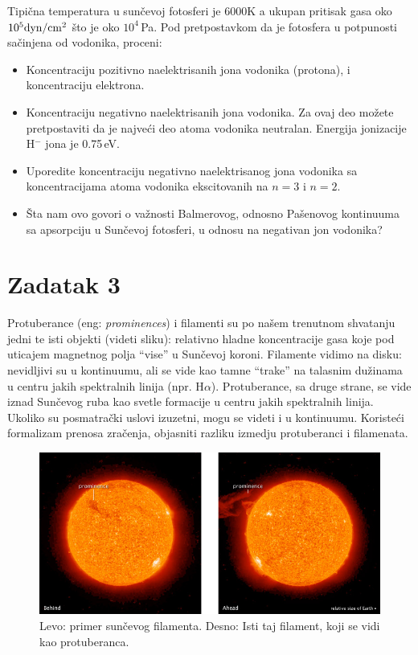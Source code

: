 \documentclass[12pt]{article}
\begin{document}
Tipi\v{c}na temperatura u sun\v{c}evoj fotosferi je 6000K a ukupan pritisak gasa oko $10^5 {\rm dyn/cm^2}$ \v{s}to je oko $10^4$\,Pa. Pod pretpostavkom da je fotosfera u potpunosti sa\v{c}injena od vodonika, proceni:
\begin{itemize}
    \item Koncentraciju pozitivno naelektrisanih jona vodonika (protona), i koncentraciju elektrona.
    \item Koncentraciju negativno naelektrisanih jona vodonika. Za ovaj deo mo\v{z}ete pretpostaviti da je najve\'{c}i deo atoma vodonika neutralan. Energija jonizacije H$^-$ jona je 0.75\,eV.
    \item Uporedite koncentraciju negativno naelektrisanog jona vodonika sa koncentracijama atoma vodonika ekscitovanih na $n=3$ i $n=2$.
    \item \v{S}ta nam ovo govori o va\v{z}nosti Balmerovog, odnosno Pa\v{s}enovog kontinuuma sa apsorpciju u Sun\v{c}evoj fotosferi, u odnosu na negativan jon vodonika?
\end{itemize}

\section*{Zadatak 3}

Protuberance (eng: \emph{prominences}) i filamenti su po na\v{s}em trenutnom shvatanju jedni te isti objekti (videti sliku): relativno hladne koncentracije gasa koje pod uticajem magnetnog polja ``vise'' u Sun\v{c}evoj koroni. Filamente vidimo na disku: nevidljivi su u kontinuumu, ali se vide kao tamne ``trake'' na talasnim du\v{z}inama u centru jakih spektralnih linija (npr. H$\alpha$). Protuberance, sa druge strane, se vide iznad Sun\v{c}evog ruba kao svetle formacije u centru jakih spektralnih linija. Ukoliko su posmatra\v{c}ki uslovi izuzetni, mogu se videti i u kontinuumu. Koriste\'{c}i formalizam prenosa zra\v{c}enja, objasniti razliku izmedju protuberanci i filamenata.

\begin{figure}
\includegraphics[width=\textwidth]{prominence.jpg}
\caption{Levo: primer sun\v{c}evog filamenta. Desno: Isti taj filament, koji se vidi kao protuberanca.}
\end{figure}
\end{document}
